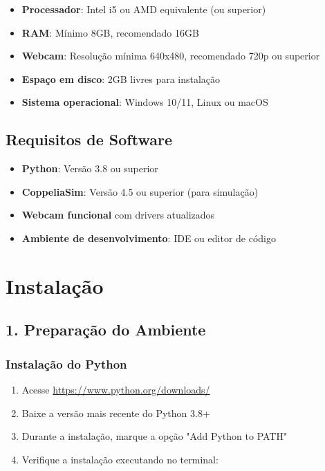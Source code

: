 \documentclass[12pt,a4paper]{article}
\begin{document}
\begin{itemize}
    \item \textbf{Processador}: Intel i5 ou AMD equivalente (ou superior)
    \item \textbf{RAM}: Mínimo 8GB, recomendado 16GB
    \item \textbf{Webcam}: Resolução mínima 640x480, recomendado 720p ou superior
    \item \textbf{Espaço em disco}: 2GB livres para instalação
    \item \textbf{Sistema operacional}: Windows 10/11, Linux ou macOS
\end{itemize}

\subsection{Requisitos de Software}

\begin{itemize}
    \item \textbf{Python}: Versão 3.8 ou superior
    \item \textbf{CoppeliaSim}: Versão 4.5 ou superior (para simulação)
    \item \textbf{Webcam funcional} com drivers atualizados
    \item \textbf{Ambiente de desenvolvimento}: IDE ou editor de código
\end{itemize}

\section{Instalação}

\subsection{1. Preparação do Ambiente}

\subsubsection{Instalação do Python}

\begin{enumerate}
    \item Acesse \url{https://www.python.org/downloads/}
    \item Baixe a versão mais recente do Python 3.8+
    \item Durante a instalação, marque a opção "Add Python to PATH"
    \item Verifique a instalação executando no terminal:
\end{enumerate}
\end{document}
